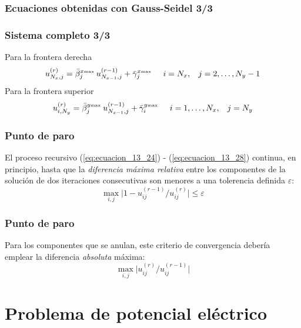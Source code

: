 \begin{frame}
\frametitle{Ecuaciones obtenidas con Gauss-Seidel 3/3}
\frametitle{Sistema completo 3/3}
Para la frontera derecha
\begin{equation}
u_{N_{x},j}^{(r)} = \bar{\beta}_{j}^{x {\text{\tiny{max}}}} \:  u_{N_{x-1}, j}^{(r-1)} + \bar{\gamma}_{j}^{x {\text{\tiny{max}}}} \hspace{0.5cm} i = N_{x}, \hspace{0.3cm} j = 2, \ldots, N_{y} - 1
\label{eq:ecuacion_13_27}
\end{equation}
\pause
Para la frontera superior
\begin{equation}
u_{i, N_{y}}^{(r)} = \bar{\beta}_{j}^{y {\text{\tiny{max}}}} \:  u_{N_{x-1}, j}^{(r-1)} + \bar{\gamma}_{i}^{y {\text{\tiny{max}}}} \hspace{0.5cm} i = 1, \ldots, N_{x}, \hspace{0.3cm} j = N_{y}
\label{eq:ecuacion_13_28}
\end{equation}
\end{frame}
\begin{frame}
\frametitle{Punto de paro}
El proceso recursivo (\ref{eq:ecuacion_13_24}) - (\ref{eq:ecuacion_13_28}) continua, en principio, hasta que la \emph{diferencia máxima relativa} entre los componentes de la solución de dos iteraciones consecutivas son menores a una tolerencia definida $\varepsilon$:     
\begin{equation}
\max_{i,j} \vert 1 - u_{ij}^{(r-1)} / u_{ij}^{(r)} \vert \leq \varepsilon
\label{eq:ecuacion_13_29}
\end{equation}
\end{frame}
\begin{frame}
\frametitle{Punto de paro}
Para los componentes que se anulan, este criterio de convergencia debería emplear la diferencia \emph{absoluta} máxima:
\[ \max_{i,j} \vert u_{ij}^{(r)} / u_{ij}^{(r-1)} \vert \]
\end{frame}
\section{Problema de potencial eléctrico}
